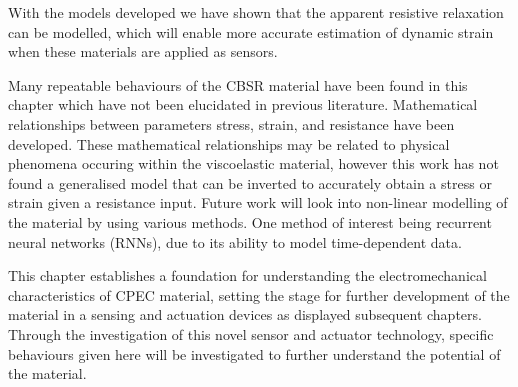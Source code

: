 With the models developed we have shown that the apparent resistive relaxation can be modelled, which will enable more accurate estimation of dynamic strain when these materials are applied as sensors. 

Many repeatable behaviours of the CBSR material have been found in this chapter which have not been elucidated in previous literature. Mathematical relationships between parameters stress, strain, and resistance have been developed. These mathematical relationships may be related to physical phenomena occuring within the viscoelastic material, however this work has not found a generalised model that can be inverted to accurately obtain a stress or strain given a resistance input. Future work will look into non-linear modelling of the material by using various methods. One method of interest being recurrent neural networks (RNNs), due to its ability to model time-dependent data.

This chapter establishes a foundation for understanding the electromechanical characteristics of CPEC material, setting the stage for further development of the material in a sensing and actuation devices as displayed subsequent chapters. Through the investigation of this novel sensor and actuator technology, specific behaviours given here will be investigated to further understand the potential of the material.


\afterpage{\blankpage}